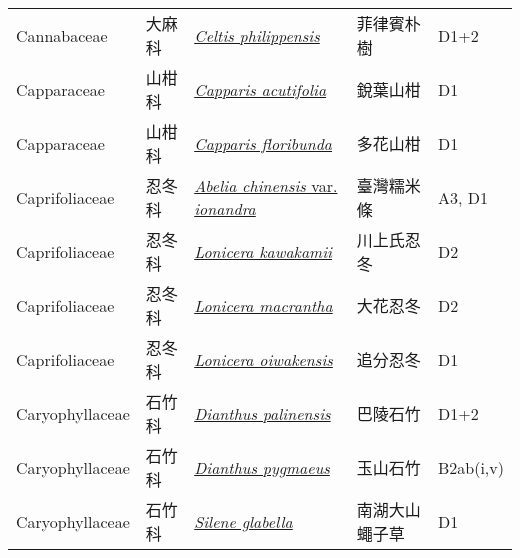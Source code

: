 {\begin{longtable}{p{2.5cm}p{2.5cm}p{4.5cm}p{2.5cm}p{3cm}}
    Cannabaceae & 大麻科 & \href{http://www.theplantlist.org/tpl1.1/search?q=Celtis+philippensis}{\textit{Celtis philippensis} } & 菲律賓朴樹 & D1+2 \index{Celtis@\textit{Celtis}!philippensis@\textit{philippensis}}  \index{菲律賓朴樹} \\
    Capparaceae & 山柑科 & \href{http://www.theplantlist.org/tpl1.1/search?q=Capparis+acutifolia}{\textit{Capparis acutifolia} } & 銳葉山柑 & D1 \index{Capparis@\textit{Capparis}!acutifolia@\textit{acutifolia}}  \index{銳葉山柑} \\
    Capparaceae & 山柑科 & \href{http://www.theplantlist.org/tpl1.1/search?q=Capparis+floribunda}{\textit{Capparis floribunda} } & 多花山柑 & D1 \index{Capparis@\textit{Capparis}!floribunda@\textit{floribunda}}  \index{多花山柑} \\
    Caprifoliaceae & 忍冬科 & \href{http://www.theplantlist.org/tpl1.1/search?q=Abelia+chinensis+var.+ionandra}{\textit{Abelia chinensis} var. \textit{ionandra} } & 臺灣糯米條 & A3, D1 \index{Abelia@\textit{Abelia}!chinensis@\textit{chinensis}!var. ionandra@var. \textit{ionandra}}  \index{臺灣糯米條} \\
    Caprifoliaceae & 忍冬科 & \href{http://www.theplantlist.org/tpl1.1/search?q=Lonicera+kawakamii}{\textit{Lonicera kawakamii} } & 川上氏忍冬 & D2 \index{Lonicera@\textit{Lonicera}!kawakamii@\textit{kawakamii}}  \index{川上氏忍冬} \\
    Caprifoliaceae & 忍冬科 & \href{http://www.theplantlist.org/tpl1.1/search?q=Lonicera+macrantha}{\textit{Lonicera macrantha} } & 大花忍冬 & D2 \index{Lonicera@\textit{Lonicera}!macrantha@\textit{macrantha}}  \index{大花忍冬} \\
    Caprifoliaceae & 忍冬科 & \href{http://www.theplantlist.org/tpl1.1/search?q=Lonicera+oiwakensis}{\textit{Lonicera oiwakensis} } & 追分忍冬 & D1 \index{Lonicera@\textit{Lonicera}!oiwakensis@\textit{oiwakensis}}  \index{追分忍冬} \\
    Caryophyllaceae & 石竹科 & \href{http://www.theplantlist.org/tpl1.1/search?q=Dianthus+palinensis}{\textit{Dianthus palinensis} } & 巴陵石竹 & D1+2 \index{Dianthus@\textit{Dianthus}!palinensis@\textit{palinensis}}  \index{巴陵石竹} \\
    Caryophyllaceae & 石竹科 & \href{http://www.theplantlist.org/tpl1.1/search?q=Dianthus+pygmaeus}{\textit{Dianthus pygmaeus} } & 玉山石竹 & B2ab(i,v) \index{Dianthus@\textit{Dianthus}!pygmaeus@\textit{pygmaeus}}  \index{玉山石竹} \\
    Caryophyllaceae & 石竹科 & \href{http://www.theplantlist.org/tpl1.1/search?q=Silene+glabella}{\textit{Silene glabella} } & 南湖大山蠅子草 & D1 \index{Silene@\textit{Silene}!glabella@\textit{glabella}}  \index{南湖大山蠅子草} \\

\end{longtable}}

